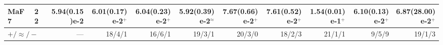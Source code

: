 \documentclass[pdflatex,sn-mathphys-ay]{sn-jnl}%
\theoremstyle{thmstyleone}%
\theoremstyle{thmstyletwo}%
\theoremstyle{thmstylethree}%
\begin{document}
\begin{landscape}
{\begin{longtable}{llrrrrrrrrr}
			MaF7                              & 22  & 5.94(0.15)e-2          & 6.01(0.17)e-2$^{+}$        & 6.04(0.23)e-2$^{+}$                & \textbf{5.92(0.39)e-2}$^{\approx}$ & 7.67(0.66)e-2$^{+}$       & 7.61(0.52)e-2$^{+}$          & 1.54(0.01)e-1$^{+}$           & 6.10(0.13)e-2$^{+}$                & 6.87(28.00)e-2$^{+}$         \\
			\midrule
			\multicolumn{2}{l}{$+/\approx/-$} & --- & 18/4/1                 & 16/6/1                     & 19/3/1                             & 20/3/0                             & 18/2/3                    & 21/1/1                       & 9/5/9                         & 19/1/3                                                            \\
		\end{longtable}
	}
\end{landscape}
\end{document}
